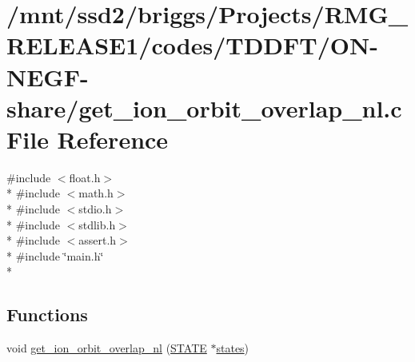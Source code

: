 \hypertarget{_t_d_d_f_t_2_o_n-_n_e_g_f-share_2get__ion__orbit__overlap__nl_8c}{\section{/mnt/ssd2/briggs/\-Projects/\-R\-M\-G\-\_\-\-R\-E\-L\-E\-A\-S\-E1/codes/\-T\-D\-D\-F\-T/\-O\-N-\/\-N\-E\-G\-F-\/share/get\-\_\-ion\-\_\-orbit\-\_\-overlap\-\_\-nl.c File Reference}
\label{_t_d_d_f_t_2_o_n-_n_e_g_f-share_2get__ion__orbit__overlap__nl_8c}
}
{\ttfamily \#include $<$float.\-h$>$}\\*
{\ttfamily \#include $<$math.\-h$>$}\\*
{\ttfamily \#include $<$stdio.\-h$>$}\\*
{\ttfamily \#include $<$stdlib.\-h$>$}\\*
{\ttfamily \#include $<$assert.\-h$>$}\\*
{\ttfamily \#include \char`\"{}main.\-h\char`\"{}}\\*
\subsection*{Functions}
\begin{DoxyCompactItemize}
\item 
void \hyperlink{_t_d_d_f_t_2_o_n-_n_e_g_f-share_2get__ion__orbit__overlap__nl_8c_ab674d3bb0a71537d21c3cd255a3b0967}{get\-\_\-ion\-\_\-orbit\-\_\-overlap\-\_\-nl} (\hyperlink{struct_s_t_a_t_e}{S\-T\-A\-T\-E} $\ast$\hyperlink{md_8h_a286ebf6b996d2b1827eb9a889dfc83d7}{states})
\end{DoxyCompactItemize}



